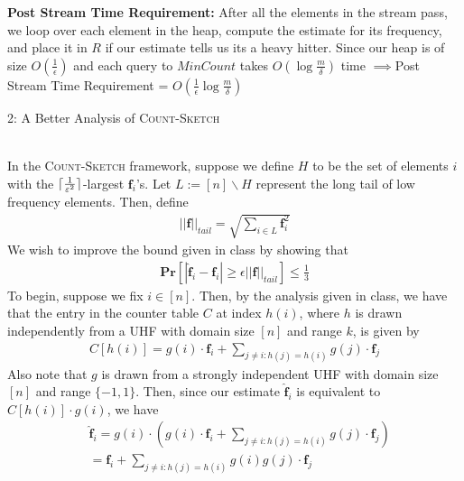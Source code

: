 \documentclass[12pt]{article}
\DeclarePairedDelimiter\ceil{\lceil}{\rceil}
\begin{document}
\begin{solution}
\textbf{Post Stream Time Requirement:} After all the elements in the stream pass, we loop over each element in the heap, compute the estimate for its frequency, and place it in $R$ if our estimate tells us its a heavy hitter. Since our heap is of size $O(\frac{1}{\epsilon})$ and each query to $MinCount$ takes $O(\log{\frac{m}{\delta}})$ time $\implies $Post Stream Time Requirement = $O(\frac{1}{\epsilon}\log{\frac{m}{\delta}})$

\end{solution}

\begin{problem}{2: A Better Analysis of \textsc{Count-Sketch}}
    
\end{problem}
\begin{solution} \ \\
    In the \textsc{Count-Sketch} framework, suppose we define $H$ to be the set of elements $i$ with the $\ceil{\frac{1}{\epsilon^2}}$-largest $\textbf{f}_i$'s. Let $L := [n] \backslash H$ represent the long tail of low frequency elements. Then, define
    \begin{align*}
        ||\textbf{f}||_{tail} = \sqrt{\sum\limits_{i \in L}\textbf{f}_i^2}
    \end{align*}
    We wish to improve the bound given in class by showing that 
    \begin{align*}
        \textbf{Pr}[|\hat{\textbf{f}}_i - \textbf{f}_i| \geq \epsilon ||\textbf{f}||_{tail}] \leq \frac{1}{3}
    \end{align*}
    To begin, suppose we fix $i \in [n]$. Then, by the analysis given in class, we have that the entry in the counter table $C$ at index $h(i)$, where $h$ is drawn independently from a UHF with domain size $[n]$ and range $k$, is given by
    \begin{align*}
        C[h(i)] = g(i) \cdot \textbf{f}_i + \sum\limits_{j \neq i:h(j) = h(i)} g(j) \cdot \textbf{f}_j
    \end{align*}
    Also note that $g$ is drawn from a strongly independent UHF with domain size $[n]$ and range $\{-1, 1\}$. Then, since our estimate $\hat{\textbf{f}}_i$ is equivalent to $C[h(i)] \cdot g(i)$, we have
    \begin{align*}
        &\hat{\textbf{f}}_i = g(i) \cdot (g(i) \cdot \textbf{f}_i + \sum\limits_{j \neq i:h(j) = h(i)} g(j) \cdot \textbf{f}_j)\\
        &= \textbf{f}_i + \sum\limits_{j \neq i:h(j) = h(i)} g(i)g(j) \cdot \textbf{f}_j 
    \end{align*}

\end{solution}
\end{document}
